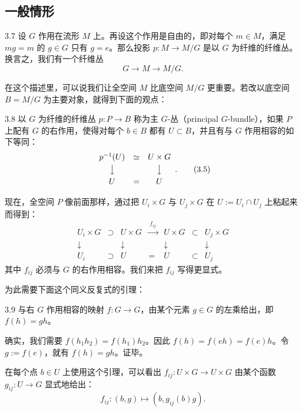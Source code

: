 \subsection{一般情形}

\begin{proposition}{3.7}
设 $G$ 作用在流形 $M$ 上。再设这个作用是自由的，即对每个 $m\in M$，满足 $mg=m$ 的 $g\in G$ 只有 $g=e$。那么投影 $p:M\to M/G$ 是以 $G$ 为纤维的纤维丛。换言之，我们有一个纤维丛
\[
G\to M\to M/G.
\]
\end{proposition}

在这个描述里，可以说我们让全空间 $M$ 比底空间 $M/G$ 更重要。若改以底空间 $B=M/G$ 为主要对象，就得到下面的观点：

\begin{definition}{3.8}
以 $G$ 为纤维的纤维丛 $p:P\to B$ 称为主 $G$-丛（principal $G$-bundle），如果 $P$ 上配有 $G$ 的右作用，使得对每个 $b\in B$ 都有 $U\subset B$，并且有与 $G$ 作用相容的如下等同：
{\small
\[
\begin{array}{ccc}
p^{-1}(U) & \simeq & U\times G\\[3pt]
\big\downarrow & & \big\downarrow\\[3pt]
U & = & U
\end{array}.
\tag{3.5}
\]
}
\end{definition}

现在，全空间 $P$ 像前面那样，通过把 $U_i\times G$ 与 $U_j\times G$ 在 $U:=U_i\cap U_j$ 上粘起来而得到：
{\small\setlength{\arraycolsep}{4pt}
\[
\begin{array}{ccccccc}
U_i\times G & \supset & U\times G & \xrightarrow{\ f_{ij}\ } & U\times G & \subset & U_j\times G\\[3pt]
\downarrow & & \downarrow & & \downarrow & & \downarrow\\[3pt]
U_i & \supset & U & = & U & \subset & U_j
\end{array}
\tag{3.6}
\]
}
其中 $f_{ij}$ 必须与 $G$ 的右作用相容。我们来把 $f_{ij}$ 写得更显式。

为此需要下面这个同义反复式的引理：

\begin{lemma}{3.9}
与右 $G$ 作用相容的映射 $f:G\to G$，由某个元素 $g\in G$ 的左乘给出，即 $f(h)=gh$。
\end{lemma}

确实，我们需要 $f(h_1h_2)=f(h_1)h_2$。因此 $f(h)=f(eh)=f(e)h$。令 $g:=f(e)$，就有 $f(h)=gh$。证毕。

在每个点 $b\in U$ 上使用这个引理，可以看出 $f_{ij}:U\times G\to U\times G$ 由某个函数 $g_{ij}:U\to G$ 显式地给出：
\[
f_{ij}:(b,g)\mapsto(b,g_{ij}(b)g).
\tag{3.7}
\]

